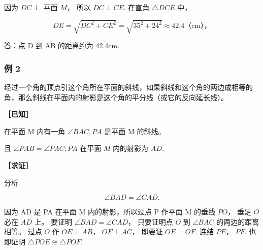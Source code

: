 因为 \(DC \perp\) 平面 \(M\)， 所以 \(DC \perp CE\). 在直角
\(\triangle DCE\) 中，

\[
D E = \sqrt {D C ^ {2} + C E ^ {2}} = \sqrt {35^{2} + 24^{2}} \approx 42.4 \text{（}\mathrm{cm}\text{），}
\]

答：点 D 到 AB 的距离约为 42.4cm.

\subsubsection{例 2}

经过一个角的顶点引这个角所在平面的斜线，如果斜线和这个角的两边成相等的角，那么斜线在平面内的射影是这个角的平分线（或它的反向延长线）。

\textbf{［已知］}

在平面 M 内有一角 \(\angle BAC, PA\) 是平面 M 的斜线。

且 \(\angle PAB = \angle PAC; PA\) 在平面 \(M\) 内的射影为 \(AD\).

\textbf{［求证］}

分析

\[
\angle B A D = \angle C A D.
\]

因为 AD 是 PA 在平面 M 内的射影，所以过点 P 作平面 M 的垂线 \(PO\)，
垂足 \(O\) 必在 \(AD\) 上。 要证明 \(\angle BAD = \angle CAD\)，
只要证明点 \(O\) 到 \(\angle BAC\) 的两边的距离相等。 过点 \(O\) 作
\(OE \perp AB\)， \(OF \perp AC\)， 即要证 \(OE = OF\). 连结 \(PE\)，
\(PF\). 也即证明 \(\triangle POE \cong \triangle POF\).


